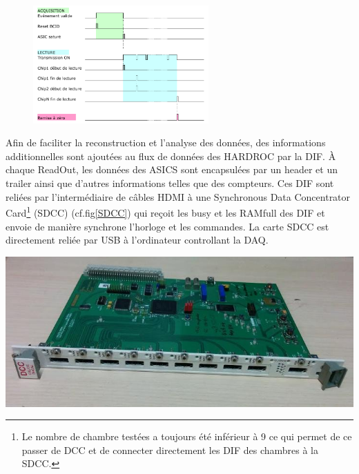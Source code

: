 \begin{figure}[ht!]
	\centering
	\includegraphics[width=0.6\textwidth]{GLA/cycle.png}
	\label{temp}
\end{figure}

Afin de faciliter la reconstruction et l'analyse des données, des informations additionnelles sont ajoutées au flux de données des HARDROC par la DIF. À chaque ReadOut, les données des ASICS sont encapsulées par un header et un trailer ainsi que d'autres informations telles que des compteurs. Ces DIF sont reliées par l'intermédiaire de câbles HDMI à une Synchronous Data Concentrator Card\footnote{Le nombre de chambre testées a toujours été inférieur à \num{9} ce qui permet de ce passer de DCC et de connecter directement les DIF des chambres à la SDCC.} (SDCC) (cf.fig\ref{SDCC}) \cite{Baulieu:2015pfa} qui reçoit les busy et les RAMfull des DIF et envoie de manière synchrone l'horloge et les commandes. La carte SDCC est directement reliée par USB à l'ordinateur controllant la DAQ.

\marginpar
{
	\centering
	\includegraphics[width=\marginparwidth]{GLA/SDCC.jpg}
	\label{SDCC}
}


